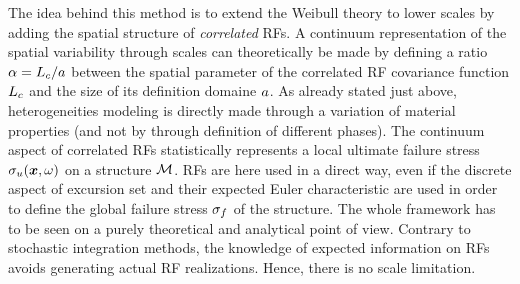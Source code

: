 \documentclass[12pt]{article}
\begin{document}
\par The idea behind this method is to extend the Weibull theory to lower scales by adding the spatial structure of \emph{correlated} RFs. A continuum representation of the spatial variability through scales can theoretically be made by defining a ratio $\alpha=L_c/a$ between the spatial parameter of the correlated RF covariance function $L_c$ and the size of its definition domaine $a$. As already stated just above, heterogeneities modeling is directly made through a variation of material properties (and not by through definition of different phases). The continuum aspect of correlated RFs statistically represents a local ultimate failure stress $\sigma_u(\boldsymbol{x},\omega)$ on a structure $\mathcal{M}$. RFs are here used in a direct way, even if the discrete aspect of excursion set and their expected Euler characteristic are used in order to define the global failure stress $\sigma_f$ of the structure. The whole framework has to be seen on a purely theoretical and analytical point of view. Contrary to stochastic integration methods, the knowledge of expected information on RFs avoids generating actual RF realizations. Hence, there is no scale limitation.
\end{document}
